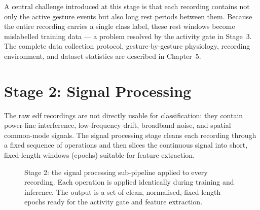 A central challenge introduced at this stage is that each recording
contains not only the active gesture events but also long rest
periods between them. Because the entire recording carries a single
class label, these rest windows become mislabelled training data ---
a problem resolved by the activity gate in Stage~3. The complete
data collection protocol, gesture-by-gesture physiology, recording
environment, and dataset statistics are described in
Chapter~5.

\section{Stage 2: Signal Processing}
\label{sec:mo_preprocessing}

The raw \acrshort{edf} recordings are not directly usable for
classification: they contain power-line interference, low-frequency
drift, broadband noise, and spatial common-mode signals. The signal
processing stage cleans each recording through a fixed sequence of
operations and then slices the continuous signal into short,
fixed-length windows (epochs) suitable for feature extraction.

\begin{figure}[htbp]
\centering
{}
\caption{Stage 2: the signal processing sub-pipeline applied to
every recording. Each operation is applied identically during
training and inference. The output is a set of clean, normalised,
fixed-length epochs ready for the activity gate and feature
extraction.}
\label{fig:mo_preprocessing}
\end{figure}

